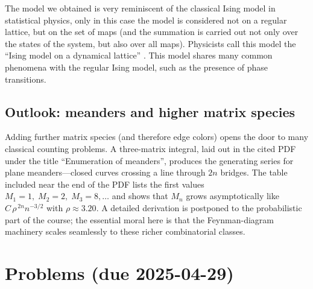 \documentclass[letterpaper,11pt,oneside,reqno]{article}
\numberwithin{equation}{section}
\theoremstyle{definition}
\begin{document}
The model we obtained is very reminiscent of the classical Ising model in statistical physics, only in this case the model is considered not on a regular lattice, but on the set of maps (and the summation is carried out not only over the states of the system, but also over all maps). Physicists call this model the ``Ising model on a dynamical lattice'' \cite{itzykson1980planar}. This model shares many common phenomena with the regular Ising model, such as the presence of phase transitions.


\subsection{Outlook: meanders and higher matrix species}
\label{subsec:meanders-brief}

Adding further matrix species (and therefore edge colors)
opens the door to many classical counting problems.
A three-matrix integral, laid out in the cited PDF under the title
“Enumeration of meanders”, produces the generating series for
plane meanders—closed curves crossing a line through $2n$ bridges.
The table included near the end of the PDF lists the first values
\(
  M_1=1,\;M_2=2,\;M_3=8,\dots
\)
and shows that $M_n$ grows asymptotically like
\(
  C\,\rho^{\,2n}n^{-3/2}
\)
with $\rho\approx3.20$.
A detailed derivation is postponed to the probabilistic part of the
course; the essential moral here is that the Feynman-diagram machinery
scales seamlessly to these richer combinatorial classes.






























\appendix
\setcounter{section}{14}

\section{Problems (due 2025-04-29)}
\end{document}
